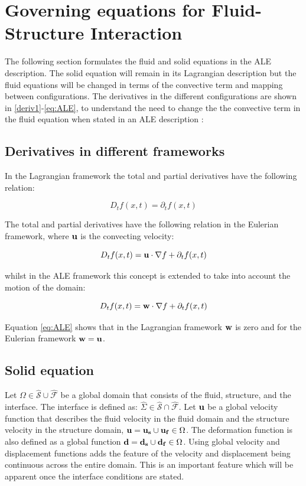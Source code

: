 \section{Governing equations for Fluid-Structure Interaction}

The following section formulates the fluid and solid equations in the ALE description. The solid equation will remain in its Lagrangian description but the fluid equations will be changed in terms of the convective term and mapping between configurations. The derivatives in the different configurations are shown in \ref{deriv1}-\ref{eq:ALE}, to understand the need to change the the convective term in the fluid equation when stated in an ALE description \cite{Wick2011}:

\subsection{Derivatives in different frameworks}

In the Lagrangian framework the total and partial derivatives have the following relation:

\begin{equation}
D_t f(x,t) = \partial_t f(x,t) 
\label{deriv1}
\end{equation}

The total and partial derivatives have the following relation in the Eulerian framework, where $\bold{u}$ is the convecting velocity:

\begin{equation}
D_t f(x,t) = \bold{u}\cdot \nabla{f} + \partial_t f(x,t)
\label{deriv2}
\end{equation}

whilst in the ALE framework this concept is extended to take into account the motion of the domain:

\begin{equation}\label{eq:ALE}
D_t f(x,t) = \bold{w} \cdot\nabla{f} + \partial_t f(x,t)
\end{equation}

Equation \ref{eq:ALE} shows that in the Lagrangian framework $ \bold{w}$ is zero and for the Eulerian framework $\bold{w} = \bold{u}$.

\subsection{Solid equation}
Let $\Omega \in \hat{\mathcal{S}} \cup \hat{\mathcal{F}} $ be a global domain that consists of the fluid, structure, and the interface. The interface is defined as: $ \hat{\Sigma} \in \hat{\mathcal{S}} \cap \hat{\mathcal{F}}  $. Let $\bold{u}$ be a global velocity function that describes the fluid velocity in the fluid domain and the structure velocity in the structure domain, $\bold{u} = \bold{u_s} \cup \bold{u_f} \in \Omega$. The deformation function is also defined as a global function $\bold{d} = \bold{d_s} \cup \bold{d_f} \in \Omega$. Using global velocity and displacement functions adds the feature of the velocity and displacement being continuous across the entire domain. This is an important feature which will be apparent once the interface conditions are stated. \newline 

